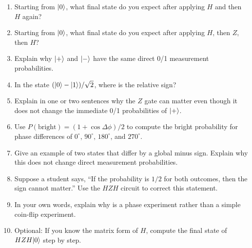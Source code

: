 \begin{enumerate}
  \item Starting from $\lvert 0\rangle$, what final state do you expect after applying $H$ and then $H$ again?
  \item Starting from $\lvert 0\rangle$, what final state do you expect after applying $H$, then $Z$, then $H$?
  \item Explain why $\lvert +\rangle$ and $\lvert -\rangle$ have the same direct 0/1 measurement probabilities.
  \item In the state $(\lvert 0\rangle-\lvert 1\rangle)/\sqrt{2}$, where is the relative sign?
  \item Explain in one or two sentences why the $Z$ gate can matter even though it does not change the immediate 0/1 probabilities of $\lvert +\rangle$.
  \item Use $P(\mathrm{bright})=(1+\cos\Delta\phi)/2$ to compute the bright probability for phase differences of $0^\circ$, $90^\circ$, $180^\circ$, and $270^\circ$.
  \item Give an example of two states that differ by a global minus sign. Explain why this does not change direct measurement probabilities.
  \item Suppose a student says, ``If the probability is $1/2$ for both outcomes, then the sign cannot matter.'' Use the $H Z H$ circuit to correct this statement.
  \item In your own words, explain why  is a phase experiment rather than a simple coin-flip experiment.
  \item Optional: If you know the matrix form of $H$, compute the final state of $H Z H\lvert 0\rangle$ step by step.
\end{enumerate}
